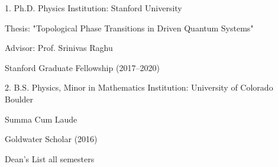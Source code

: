 

\begin{cventries}


\cventry
{1. Ph.D. Physics}
{Institution:}
{Stanford University}
{}
{
\begin{cvitems}


\item {Thesis: "Topological Phase Transitions in Driven Quantum Systems"}

\item {Advisor: Prof. Srinivas Raghu}

\item {Stanford Graduate Fellowship (2017–2020)}


\end{cvitems}
}


\cventry
{2. B.S. Physics, Minor in Mathematics}
{Institution:}
{University of Colorado Boulder}
{}
{
\begin{cvitems}


\item {Summa Cum Laude}

\item {Goldwater Scholar (2016)}

\item {Dean's List all semesters}


\end{cvitems}
}


\end{cventries}

